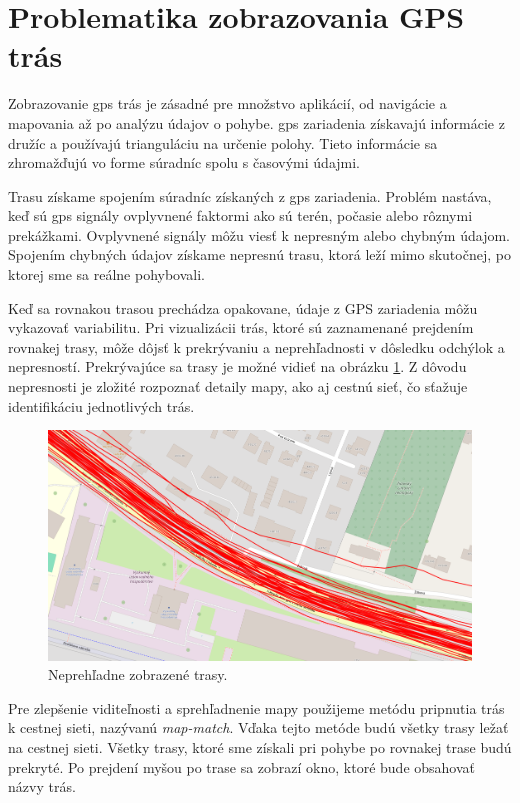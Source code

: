 \section{Problematika zobrazovania GPS trás}

\indent \indent Zobrazovanie \acrshort{gps} trás je zásadné pre množstvo aplikácií, od navigácie a mapovania až po analýzu údajov o pohybe. \acrshort{gps} zariadenia získavajú informácie z družíc a používajú trianguláciu na určenie polohy. Tieto informácie sa zhromažďujú vo forme súradníc spolu s časovými údajmi\cite{Hegarty2017}. 

Trasu získame spojením súradníc získaných z \acrshort{gps} zariadenia. Problém nastáva, keď sú \acrshort{gps} signály ovplyvnené faktormi ako sú terén, počasie alebo rôznymi prekážkami. Ovplyvnené signály môžu viesť k nepresným alebo chybným údajom\cite{Hegarty2017}. Spojením chybných údajov získame nepresnú trasu, ktorá leží mimo skutočnej, po ktorej sme sa reálne pohybovali.

Keď sa rovnakou trasou prechádza opakovane, údaje z GPS zariadenia môžu vykazovať variabilitu. Pri vizualizácii trás, ktoré sú zaznamenané prejdením rovnakej trasy, môže dôjsť k prekrývaniu a neprehľadnosti v dôsledku odchýlok a nepresností. Prekrývajúce sa trasy je možné vidieť na obrázku \ref{fig:neprehladne-trasy}. Z dôvodu nepresnosti je zložité rozpoznať detaily mapy, ako aj cestnú sieť, čo sťažuje identifikáciu jednotlivých trás.

\begin{figure}[H]
    \centering
    \includegraphics[width=.8 \textwidth]{img/problematika_gps/neprehladne_trasy.png}
    \caption{Neprehľadne zobrazené trasy.}
    \label{fig:neprehladne-trasy}
  \end{figure}

  Pre zlepšenie viditeľnosti a sprehľadnenie mapy použijeme metódu pripnutia trás k cestnej sieti, nazývanú \textit{map-match}. Vďaka tejto metóde budú všetky trasy ležať na cestnej sieti. Všetky trasy, ktoré sme získali pri pohybe po rovnakej trase budú prekryté. Po prejdení myšou po trase sa zobrazí okno, ktoré bude obsahovať názvy trás.